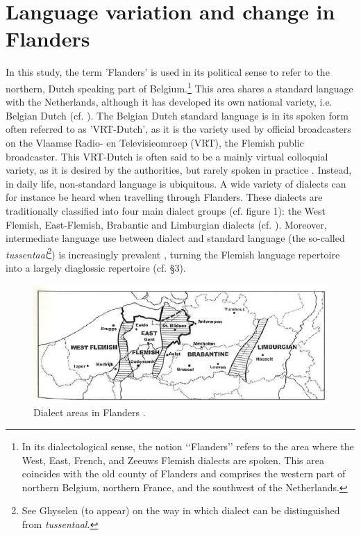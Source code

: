 \documentclass[output=paper]{LSP/langsci}
\begin{document}
\section{Language variation and change in Flanders}

In this study, the term 'Flanders' is used in its political sense to refer to the northern, Dutch speaking part of Belgium.\footnote{In its dialectological sense, the notion ‘‘Flanders’’ refers to the area where the West, East, French, and Zeeuws Flemish dialects are spoken. This area coincides with the old county of Flanders and comprises the western part of northern Belgium, northern France, and the southwest of the Netherlands.} This area shares a standard language with the Netherlands, although it has developed its own national variety, i.e. Belgian Dutch (cf. \citealt{grondelaers_standard_2011}). The Belgian Dutch standard language is in its spoken form often referred to as 'VRT-Dutch', as it is the variety used by official broadcasters on the Vlaamse Radio- en Televisieomroep (VRT), the Flemish public broadcaster. This VRT-Dutch is often said to be a mainly virtual colloquial variety, as it is desired by the authorities, but rarely spoken in practice \citep[19]{de_caluwe_tussentaal_2009}. Instead, in daily life, non-standard language is ubiquitous. A wide variety of dialects can for instance be heard when travelling through Flanders. These dialects are traditionally classified into four main dialect groups (cf. figure 1): the West Flemish, East-Flemish, Brabantic and Limburgian dialects (cf. \citealt{vandekerckhove_dialect_2009}). Moreover, intermediate language use between dialect and standard language (the so-called \textit{tussentaal}\footnote{See Ghyselen (to appear) on the way in which dialect can be distinguished from \textit{tussentaal.}}) is increasingly prevalent \citep{de_caluwe_tussentaal_2006}, turning the Flemish language repertoire into a largely diaglossic repertoire (cf. §3).

\begin{figure}
\includegraphics[width=\textwidth]{illustrations/ghys_fig1.png}
\caption{Dialect areas in Flanders \citep[359]{taeldeman_linguistic_2009}.}
\end{figure}
\end{document}
